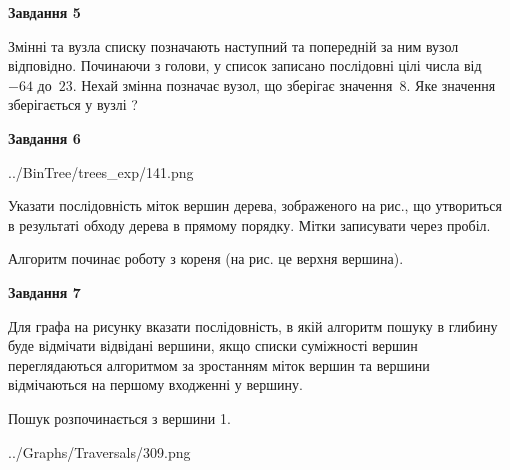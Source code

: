 \documentclass[12pt, ukrainian]{article}
\begin{document}
{\begin {large}
{\begin {center}\textbf{Завдання 5}\end {center}}\par
Змінні  та  вузла списку позначають наступний та попередній за ним вузол відповідно. Починаючи з голови, у список записано послідовні цілі числа від~$-64$ до~$23$. Нехай змінна  позначає вузол, що зберігає значення~$8$.
Яке значення зберігається у вузлі  ?\par
\newpage

{\begin {center}\textbf{Завдання 6}\end {center}}\par

\begin{center}
	{../BinTree/trees_exp/141.png}
\end{center}
Указати послідовність міток вершин дерева, зображеного на рис., що утвориться в результаті обходу дерева в прямому порядку. Мітки записувати через пробіл.\par Алгоритм починає роботу з кореня (на рис. це верхня вершина).\par
\newpage

{\begin {center}\textbf{Завдання 7}\end {center}}\par
Для графа на рисунку вказати послідовність, в якій алгоритм пошуку в глибину буде відмічати відвідані вершини, якщо списки суміжності вершин переглядаються алгоритмом за зростанням міток вершин та вершини відмічаються на першому вход\-женні у вершину.\par
Пошук розпочинається з вершини 1.\par

\begin{center}
	{../Graphs/Traversals/309.png}
\end{center}\par
\newpage


\end{large}}
\end{document}
